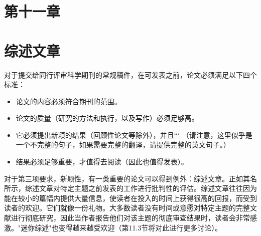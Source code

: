 \section*{第十一章}
\section*{综述文章}
对于提交给同行评审科学期刊的常规稿件，在可发表之前，论文必须满足以下四个标准：

\begin{itemize}
\item 论文的内容必须符合期刊的范围。
\item 论文的质量（研究的方法和执行，以及写作）必须足够高。
\item 它必须提出新颖的结果（回顾性论文等除外），并且``` 
（请注意，这里似乎是一个不完整的句子，如果需要完整的翻译，请提供完整的英文句子。）
\item 结果必须足够重要，才值得去阅读（因此也值得发表）。
\end{itemize}

对于第三项要求，新颖性，有一类重要的论文可以得到例外：综述文章。正如其名所示，综述文章对特定主题之前发表的工作进行批判性的评估。综述文章往往因为能在较小的篇幅内提供大量信息，使读者在投入的时间上获得很高的回报，而受到读者的欢迎。它们就像一份礼物。大多数读者没有时间或意愿对特定主题的完整文献进行彻底研究，因此当作者报告他们对该主题的彻底审查结果时，读者会非常感激。"迷你综述"也变得越来越受欢迎（第11.3节将对此进行更多讨论）。

